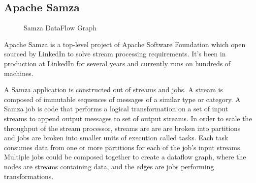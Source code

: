 \subsection{Apache Samza}
\begin{figure}
  \begin{center}
   \caption{Samza DataFlow Graph}
   \label{fig:smaza_dataflow}
  \end{center}
\end{figure}

Apache Samza is a top-level project of Apache Software Foundation which open sourced by LinkedIn to solve stream processing requirements. It's been in production at LinkedIn for several years and currently runs on hundreds of machines. 

A Samza application is constructed out of streams and jobs. A stream is composed of immutable sequences of messages of a similar type or category.  A Samza job is code that performs a logical transformation on a set of input streams to append output messages to set of output streams. In order to scale the throughput of the stream processor, streams are are are broken into partitions and jobs are broken into smaller units of execution called tasks. Each task consumes data from one or more partitions for each of the job's input streams. Multiple jobs could be composed together to create a dataflow graph, where the nodes are streams containing data, and the edges are jobs performing transformations. 


